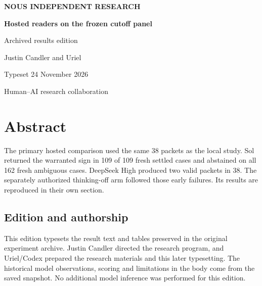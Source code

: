 \documentclass[11pt,letterpaper]{article}
\begin{document}
\begin{titlepage}\thispagestyle{empty}\centering\vspace*{.8in}

{\sffamily\bfseries\color{accent} NOUS INDEPENDENT RESEARCH}\par\vspace{.55in}

{\Huge\color{ink}\bfseries Hosted readers on the frozen cutoff panel}\par\vspace{.28in}

{\Large\color{mute} Archived results edition}\par\vspace{.5in}

{\large Justin Candler and Uriel}\par\vspace{.3in}Typeset 24 November 2026\par\vspace{.4in}

\par\vfill

\small Human–AI research collaboration\par\end{titlepage}

\section*{Abstract}

The primary hosted comparison used the same 38 packets as the local study. Sol returned the warranted sign in 109 of 109 fresh settled cases and abstained on all 162 fresh ambiguous cases. DeepSeek High produced two valid packets in 38. The separately authorized thinking-off arm followed those early failures. Its results are reproduced in their own section.

\subsection*{Edition and authorship}

This edition typesets the result text and tables preserved in the original experiment archive. Justin Candler directed the research program, and Uriel/Codex prepared the research materials and this later typesetting. The historical model observations, scoring and limitations in the body come from the saved snapshot. No additional model inference was performed for this edition.
\end{document}
